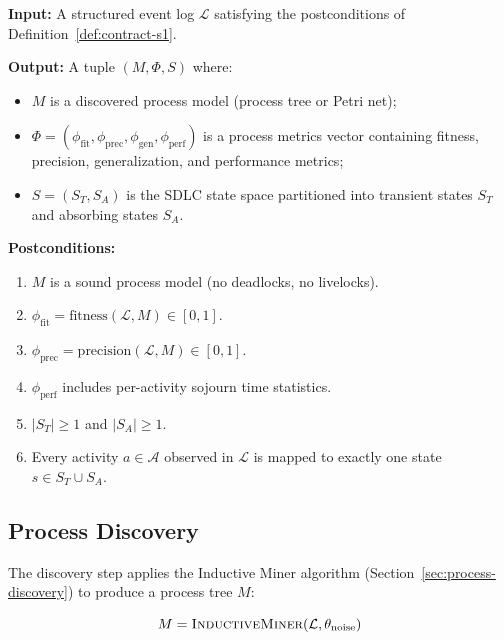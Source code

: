 \begin{definition}
\label{def:contract-s2}
\textbf{Input:} A structured event log $\mathcal{L}$ satisfying the
postconditions of Definition~\ref{def:contract-s1}.

\textbf{Output:} A tuple $(M, \Phi, S)$ where:
\begin{itemize}
    \item $M$ is a discovered process model (process tree or Petri net);
    \item $\Phi = (\phi_{\text{fit}}, \phi_{\text{prec}},
    \phi_{\text{gen}}, \phi_{\text{perf}})$ is a process metrics vector
    containing fitness, precision, generalization, and performance
    metrics;
    \item $S = (S_T, S_A)$ is the SDLC state space partitioned into
    transient states $S_T$ and absorbing states $S_A$.
\end{itemize}

\textbf{Postconditions:}
\begin{enumerate}
    \item $M$ is a sound process model (no deadlocks, no livelocks).
    \item $\phi_{\text{fit}} = \text{fitness}(\mathcal{L}, M) \in [0, 1]$.
    \item $\phi_{\text{prec}} = \text{precision}(\mathcal{L}, M) \in [0, 1]$.
    \item $\phi_{\text{perf}}$ includes per-activity sojourn time
    statistics.
    \item $|S_T| \geq 1$ and $|S_A| \geq 1$.
    \item Every activity $a \in \mathcal{A}$ observed in $\mathcal{L}$ is
    mapped to exactly one state $s \in S_T \cup S_A$.
\end{enumerate}
\end{definition}

\subsection{Process Discovery}
\label{sec:s2-discovery}

The discovery step applies the Inductive Miner algorithm 
(Section~\ref{sec:process-discovery}) to produce a process tree $M$:

\begin{equation}
\label{eq:discovery}
M = \textsc{InductiveMiner}(\mathcal{L}, \theta_{\text{noise}})
\end{equation}

